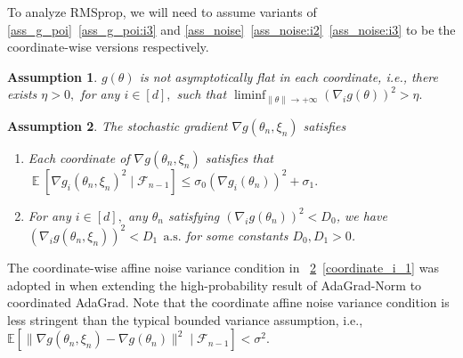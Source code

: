 \documentclass[standalone]{article}
\DeclareMathOperator{\Expect}{\mathbb{E}}
\newtheorem{assumpt}{Assumption}[section]
\begin{document}
To analyze RMSprop, we will need to assume variants of  \cref{ass_g_poi}~\ref{ass_g_poi:i3} and \cref{ass_noise}~\ref{ass_noise:i2}~\ref{ass_noise:i3} to be the coordinate-wise versions respectively. 
\begin{assumpt}\label{coordinate_0}
$g(\theta)$ is not asymptotically flat in each coordinate, i.e., there exists $\eta>0,$ for any $i\in[d],$ such that $\liminf_{\|\theta\|\rightarrow+\infty} (\nabla_{i} g(\theta))^{2}>\eta.$ 
\end{assumpt}
\begin{assumpt}\label{coordinate}
The stochastic gradient $\nabla g(\theta_n, \xi_n)$ satisfies 
\begin{enumerate}[label=\textnormal{(\roman*)},leftmargin=*]
\item\label{coordinate_i_1}  
Each coordinate of $\nabla g(\theta_{n},\xi_{n})$  satisfies that \(\Expect[\nabla g_{i}(\theta_{n},\xi_{n})^{2} \mid \mathscr{F}_{n-1}]  \leq \sigma_{0}(\nabla g_{i}(\theta_{n}))^{2} + \sigma_{1}.\)
 \item\label{coordinate_i_2}  For any $i\in[d],$ any $\theta_n$ satisfying $(\nabla_{i} g(\theta_{n}))^{2}<D_{0}$, we have $(\nabla_{i} g(\theta_{n},\xi_{n}))^{2}<D_{1}\ \ \text{a.s.}$ for some constants $D_0, D_1 >0$.
\end{enumerate}
\end{assumpt}
The coordinate-wise affine noise variance condition in ~\cref{coordinate}~\ref{coordinate_i_1} was adopted in \cite{wang2023convergence} when extending the high-probability result of AdaGrad-Norm to coordinated AdaGrad. 
Note that the coordinate affine noise variance condition is less stringent than the typical bounded variance assumption, i.e., \(\mathbb{E} [\|\nabla g(\theta_{n},\xi_{n}) - \nabla g(\theta_{n})\|^{2} \mid \mathscr{F}_{n-1}] < \sigma^{2}.\)
\end{document}
